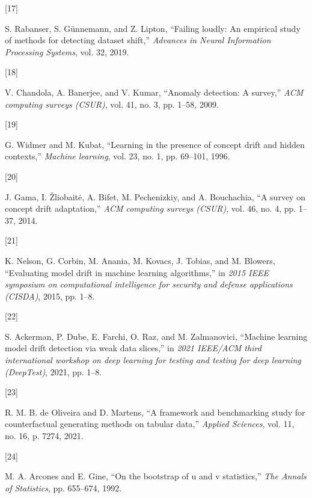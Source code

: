 \documentclass[
  conference]{IEEEtran}
\newlength{\cslhangindent}
\newlength{\csllabelwidth}
\newlength{\cslentryspacingunit} %
\newenvironment{CSLReferences}[2] %
 {%
  \setlength{\parindent}{0pt}
  \ifodd #1
  \let\oldpar\par
  \def\par{\hangindent=\cslhangindent\oldpar}
  \fi
  \setlength{\parskip}{#2\cslentryspacingunit}
 }%
 {}
\newcommand{\CSLLeftMargin}[1]{\parbox[t]{\csllabelwidth}{#1}}
\newcommand{\CSLRightInline}[1]{\parbox[t]{\linewidth - \csllabelwidth}{#1}\break}
\begin{document}
\begin{CSLReferences}{0}{0}
\leavevmode{}%
\CSLLeftMargin{{[}17{]} }%
\CSLRightInline{S. Rabanser, S. Günnemann, and Z. Lipton, {``Failing
loudly: An empirical study of methods for detecting dataset shift,''}
\emph{Advances in Neural Information Processing Systems}, vol. 32,
2019.}

\leavevmode{}%
\CSLLeftMargin{{[}18{]} }%
\CSLRightInline{V. Chandola, A. Banerjee, and V. Kumar, {``Anomaly
detection: A survey,''} \emph{ACM computing surveys (CSUR)}, vol. 41,
no. 3, pp. 1--58, 2009.}

\leavevmode{}%
\CSLLeftMargin{{[}19{]} }%
\CSLRightInline{G. Widmer and M. Kubat, {``Learning in the presence of
concept drift and hidden contexts,''} \emph{Machine learning}, vol. 23,
no. 1, pp. 69--101, 1996.}

\leavevmode{}%
\CSLLeftMargin{{[}20{]} }%
\CSLRightInline{J. Gama, I. Žliobaitė, A. Bifet, M. Pechenizkiy, and A.
Bouchachia, {``A survey on concept drift adaptation,''} \emph{ACM
computing surveys (CSUR)}, vol. 46, no. 4, pp. 1--37, 2014.}

\leavevmode{}%
\CSLLeftMargin{{[}21{]} }%
\CSLRightInline{K. Nelson, G. Corbin, M. Anania, M. Kovacs, J. Tobias,
and M. Blowers, {``Evaluating model drift in machine learning
algorithms,''} in \emph{2015 IEEE symposium on computational
intelligence for security and defense applications (CISDA)}, 2015, pp.
1--8.}

\leavevmode{}%
\CSLLeftMargin{{[}22{]} }%
\CSLRightInline{S. Ackerman, P. Dube, E. Farchi, O. Raz, and M.
Zalmanovici, {``Machine learning model drift detection via weak data
slices,''} in \emph{2021 IEEE/ACM third international workshop on deep
learning for testing and testing for deep learning (DeepTest)}, 2021,
pp. 1--8.}

\leavevmode{}%
\CSLLeftMargin{{[}23{]} }%
\CSLRightInline{R. M. B. de Oliveira and D. Martens, {``A framework and
benchmarking study for counterfactual generating methods on tabular
data,''} \emph{Applied Sciences}, vol. 11, no. 16, p. 7274, 2021.}

\leavevmode{}%
\CSLLeftMargin{{[}24{]} }%
\CSLRightInline{M. A. Arcones and E. Gine, {``On the bootstrap of u and
v statistics,''} \emph{The Annals of Statistics}, pp. 655--674, 1992.}


\end{CSLReferences}
\end{document}
